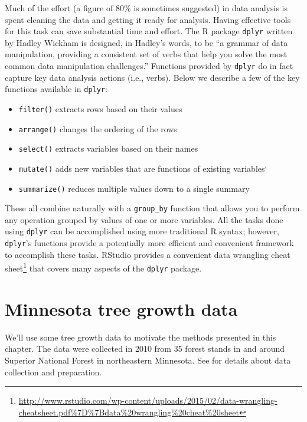 \documentclass[]{krantz}
\providecommand{\tightlist}{%
  \setlength{\itemsep}{0pt}\setlength{\parskip}{0pt}}
\renewcommand{\href}[2]{#2\footnote{\url{#1}}}
\begin{document}
Much of the effort (a figure of 80\% is sometimes suggested) in data analysis is spent cleaning the data and getting it ready for analysis. Having effective tools for this task can save substantial time and effort. The R package \texttt{dplyr} written by Hadley Wickham is designed, in Hadley's words, to be ``a grammar of data manipulation, providing a consistent set of verbs that help you solve the most common data manipulation challenges.'' Functions provided by \texttt{dplyr} do in fact capture key data analysis actions (i.e., verbs). Below we describe a few of the key functions available in \texttt{dplyr}:

\begin{itemize}
\tightlist
\item
  \texttt{filter()} extracts rows based on their values
\item
  \texttt{arrange()} changes the ordering of the rows
\item
  \texttt{select()} extracts variables based on their names
\item
  \texttt{mutate()} adds new variables that are functions of existing variables`
\item
  \texttt{summarize()} reduces multiple values down to a single summary
\end{itemize}

These all combine naturally with a \texttt{group\_by} function that allows you to perform any operation grouped by values of one or more variables. All the tasks done using \texttt{dplyr} can be accomplished using more traditional R syntax; however, \texttt{dplyr}'s functions provide a potentially more efficient and convenient framework to accomplish these tasks. RStudio provides a convenient \href{http://www.rstudio.com/wp-content/uploads/2015/02/data-wrangling-cheatsheet.pdf\%7D\%7Bdata\%20wrangling\%20cheat\%20sheet}{data wrangling cheat sheet} that covers many aspects of the \texttt{dplyr} package.

\hypertarget{minnesota-tree-growth-data}{%
\section{Minnesota tree growth data}\label{minnesota-tree-growth-data}}

We'll use some tree growth data to motivate the methods presented in this chapter. The data were collected in 2010 from 35 forest stands in and around Superior National Forest in northeastern Minnesota. See \citet{foster14} for details about data collection and preparation.
\end{document}
